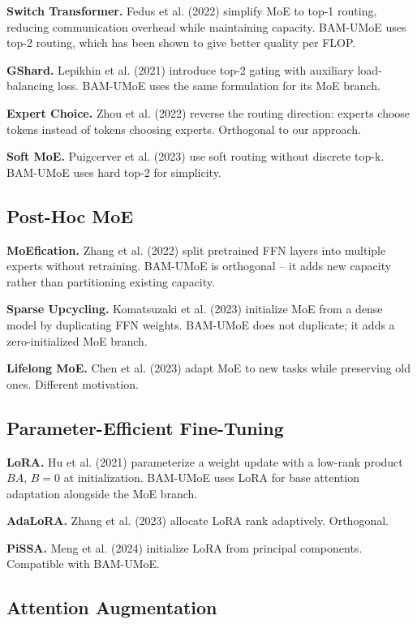 \textbf{Switch Transformer.} Fedus et al. (2022) simplify MoE to top-1 routing, 
reducing communication overhead while maintaining capacity. BAM-UMoE uses 
top-2 routing, which has been shown to give better quality per FLOP.

\textbf{GShard.} Lepikhin et al. (2021) introduce top-2 gating with auxiliary 
load-balancing loss. BAM-UMoE uses the same formulation for its MoE branch.

\textbf{Expert Choice.} Zhou et al. (2022) reverse the routing direction: experts 
choose tokens instead of tokens choosing experts. Orthogonal to our approach.

\textbf{Soft MoE.} Puigcerver et al. (2023) use soft routing without discrete 
top-k. BAM-UMoE uses hard top-2 for simplicity.

\subsection{Post-Hoc MoE}

\textbf{MoEfication.} Zhang et al. (2022) split pretrained FFN layers into 
multiple experts without retraining. BAM-UMoE is orthogonal -- it adds new 
capacity rather than partitioning existing capacity.

\textbf{Sparse Upcycling.} Komatsuzaki et al. (2023) initialize MoE from a dense 
model by duplicating FFN weights. BAM-UMoE does not duplicate; it adds 
a zero-initialized MoE branch.

\textbf{Lifelong MoE.} Chen et al. (2023) adapt MoE to new tasks while preserving 
old ones. Different motivation.

\subsection{Parameter-Efficient Fine-Tuning}

\textbf{LoRA.} Hu et al. (2021) parameterize a weight update with a low-rank 
product $BA$, $B = 0$ at initialization. BAM-UMoE uses LoRA for base 
attention adaptation alongside the MoE branch.

\textbf{AdaLoRA.} Zhang et al. (2023) allocate LoRA rank adaptively. Orthogonal.

\textbf{PiSSA.} Meng et al. (2024) initialize LoRA from principal components. 
Compatible with BAM-UMoE.

\subsection{Attention Augmentation}

